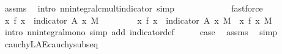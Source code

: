 \begin{isabellebody}
\ assms{\isacharparenleft}{\kern0pt}{}{\isacharparenright}{\kern0pt}\ \isamarkupfalse%
\ {\isacharparenleft}{\kern0pt}intro\ nn{\isacharunderscore}{\kern0pt}integral{\isacharunderscore}{\kern0pt}cmult{\isacharunderscore}{\kern0pt}indicator{\isacharcomma}{\kern0pt}\ simp{\isacharparenright}{\kern0pt}\isanewline
\ \ \isamarkupfalse%
\ \isamarkupfalse%
\ {\isachardoublequoteopen}{\isachardot}{\kern0pt}{\isachardot}{\kern0pt}{\isachardot}{\kern0pt}\ {\isacharequal}{\kern0pt}\ {\isasyminfinity}{\isachardoublequoteclose}\ \isamarkupfalse%
\ {\isacharasterisk}{\kern0pt}\ \isamarkupfalse%
\ fastforce\isanewline
\ \ \isamarkupfalse%
\ \isamarkupfalse%
\ {\isachardoublequoteopen}{\isacharparenleft}{\kern0pt}{\isasymintegral}\isactrlsup {\isacharplus}{\kern0pt}x{\isachardot}{\kern0pt}\ f\ x\ {\isacharasterisk}{\kern0pt}\ indicator\ {\isacharquery}{\kern0pt}A\ x\ {\isasympartial}M{\isacharparenright}{\kern0pt}\ {\isacharequal}{\kern0pt}\ {\isasyminfinity}{\isachardoublequoteclose}\ \isacommand{{\isachardot}{\kern0pt}}\isamarkupfalse%
\isanewline
\ \ \isamarkupfalse%
\ \isamarkupfalse%
\ {\isachardoublequoteopen}{\isacharparenleft}{\kern0pt}{\isasymintegral}\isactrlsup {\isacharplus}{\kern0pt}x{\isachardot}{\kern0pt}\ f\ x\ {\isacharasterisk}{\kern0pt}\ indicator\ {\isacharquery}{\kern0pt}A\ x\ {\isasympartial}M{\isacharparenright}{\kern0pt}\ {\isasymle}\ {\isacharparenleft}{\kern0pt}{\isasymintegral}\isactrlsup {\isacharplus}{\kern0pt}x{\isachardot}{\kern0pt}\ f\ x\ {\isasympartial}M{\isacharparenright}{\kern0pt}{\isachardoublequoteclose}\ \isamarkupfalse%
\ {\isacharparenleft}{\kern0pt}intro\ nn{\isacharunderscore}{\kern0pt}integral{\isacharunderscore}{\kern0pt}mono{\isacharcomma}{\kern0pt}\ simp\ add{\isacharcolon}{\kern0pt}\ indicator{\isacharunderscore}{\kern0pt}def{\isacharparenright}{\kern0pt}\isanewline
\ \ \isamarkupfalse%
\ \isamarkupfalse%
\ {\isacharquery}{\kern0pt}case\ \isamarkupfalse%
\ assms{\isacharparenleft}{\kern0pt}{}{\isacharparenright}{\kern0pt}\ \isamarkupfalse%
\ simp\isanewline
{}\isamarkupfalse%
%
\endisatagproof
{\isafoldproof}%
%
\isadelimproof
\isanewline
%
\endisadelimproof
\isanewline
\isanewline
\isanewline
\isanewline
{}\isamarkupfalse%
\ cauchy{\isacharunderscore}{\kern0pt}L{}{\isacharunderscore}{\kern0pt}AE{\isacharunderscore}{\kern0pt}cauchy{\isacharunderscore}{\kern0pt}subseq{\isacharcolon}{\kern0pt}\isanewline

\end{isabellebody}
